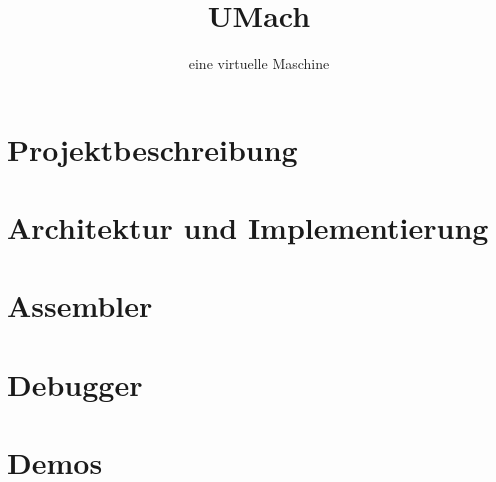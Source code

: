 \documentclass{beamer}
\title{UMach}
\subtitle{eine virtuelle Maschine}
\author{}
\institute{Georg-Simon-Ohm-Hochschule}
\date{}
\begin{document}
\frame{\titlepage}



\part{Projektbeschreibung}


\part{Architektur und Implementierung}


\part{Assembler}


\part{Debugger}


\part{Demos}

\end{document}
